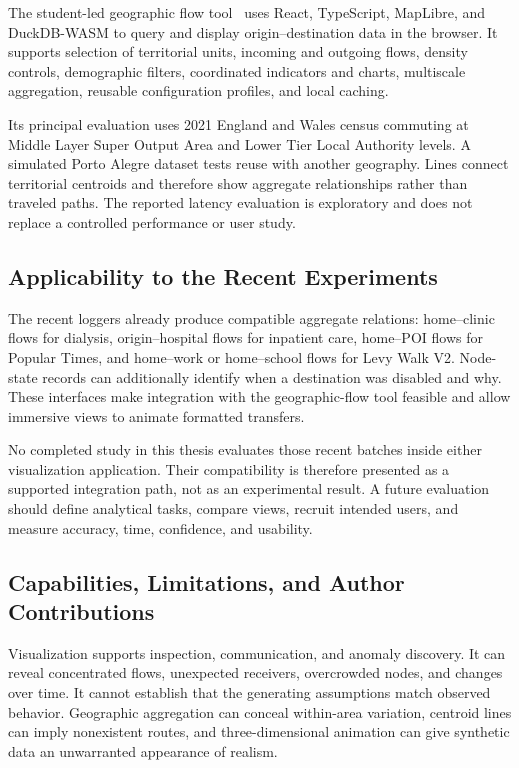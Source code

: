 \documentclass[pdflatex,sn-mathphys-num]{sn-jnl}%
\theoremstyle{thmstyleone}%
\theoremstyle{thmstyletwo}%
\theoremstyle{thmstylethree}%
\begin{document}
The student-led geographic flow tool~\citep{silva2026geospatial} uses React, TypeScript, MapLibre, and DuckDB-WASM to query and display origin--destination data in the browser. It supports selection of territorial units, incoming and outgoing flows, density controls, demographic filters, coordinated indicators and charts, multiscale aggregation, reusable configuration profiles, and local caching.

Its principal evaluation uses 2021 England and Wales census commuting at Middle Layer Super Output Area and Lower Tier Local Authority levels. A simulated Porto Alegre dataset tests reuse with another geography. Lines connect territorial centroids and therefore show aggregate relationships rather than traveled paths. The reported latency evaluation is exploratory and does not replace a controlled performance or user study.

\subsection{Applicability to the Recent Experiments}

The recent loggers already produce compatible aggregate relations: home--clinic flows for dialysis, origin--hospital flows for inpatient care, home--POI flows for Popular Times, and home--work or home--school flows for Levy Walk V2. Node-state records can additionally identify when a destination was disabled and why. These interfaces make integration with the geographic-flow tool feasible and allow immersive views to animate formatted transfers.

No completed study in this thesis evaluates those recent batches inside either visualization application. Their compatibility is therefore presented as a supported integration path, not as an experimental result. A future evaluation should define analytical tasks, compare views, recruit intended users, and measure accuracy, time, confidence, and usability.

\subsection{Capabilities, Limitations, and Author Contributions}

Visualization supports inspection, communication, and anomaly discovery. It can reveal concentrated flows, unexpected receivers, overcrowded nodes, and changes over time. It cannot establish that the generating assumptions match observed behavior. Geographic aggregation can conceal within-area variation, centroid lines can imply nonexistent routes, and three-dimensional animation can give synthetic data an unwarranted appearance of realism.
\end{document}
